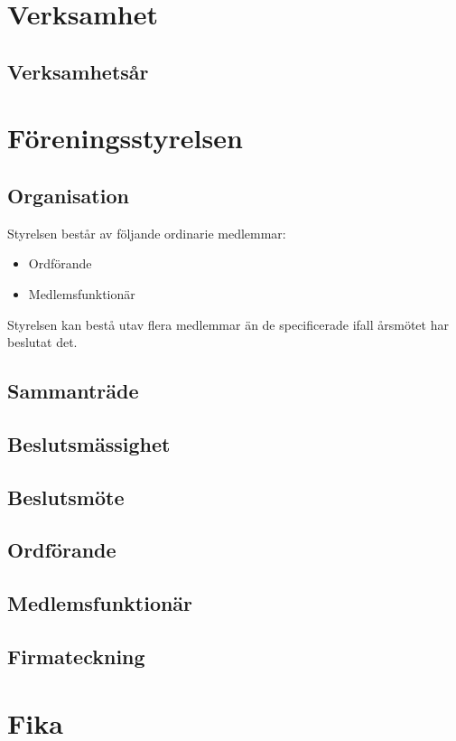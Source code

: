 \documentclass{article}
\begin{document}
\section{Verksamhet}
\subsection{Verksamhetsår}

\section{Föreningsstyrelsen}
\subsection{Organisation}
Styrelsen består av följande ordinarie medlemmar:
\begin{itemize}
  \item Ordförande
  \item Medlemsfunktionär
\end{itemize}
Styrelsen kan bestå utav flera medlemmar än de specificerade ifall årsmötet har
beslutat det.

\subsection{Sammanträde}

\subsection{Beslutsmässighet}

\subsection{Beslutsmöte}

\subsection{Ordförande}

\subsection{Medlemsfunktionär}


\subsection{Firmateckning}

\section{Fika}
\end{document}
